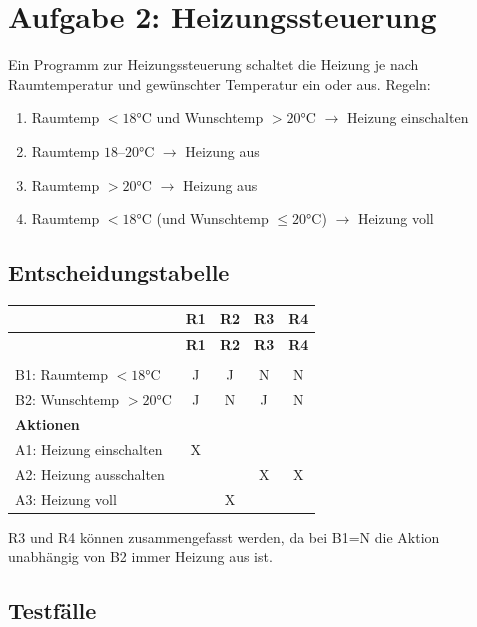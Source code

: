 \documentclass[
	fontsize=12pt,          %
	paper=a4,               %
	numbers=noenddot,       %
	listof=totoc,           %
	listof=entryprefix,     %
	listof=nochaptergap,    %
	bibliography=totoc,     %
	parskip=half,           %
	openany                 %
]{scrbook}
\begin{document}
\chapter*{Aufgabe 2: Heizungssteuerung}

Ein Programm zur Heizungssteuerung schaltet die Heizung je nach Raumtemperatur und gewünschter Temperatur ein oder aus.
Regeln:
\begin{enumerate}
	\item Raumtemp $< 18$°C und Wunschtemp $> 20$°C $\rightarrow$ Heizung einschalten
	\item Raumtemp $18$--$20$°C $\rightarrow$ Heizung aus
	\item Raumtemp $> 20$°C $\rightarrow$ Heizung aus
	\item Raumtemp $< 18$°C (und Wunschtemp $\leq 20$°C) $\rightarrow$ Heizung voll
\end{enumerate}

\section*{Entscheidungstabelle}

\begin{longtable}{| p{4.5cm} | c | c | c | c |}
	\hline
	& \textbf{R1} & \textbf{R2} & \textbf{R3} & \textbf{R4} \\ \hline
	\endfirsthead
	\hline
	& \textbf{R1} & \textbf{R2} & \textbf{R3} & \textbf{R4} \\ \hline
	\endhead
	\hline
	\endfoot
	\multicolumn{5}{|l|}{\textbf{Bedingungen}} \\ \hline
	B1: Raumtemp $< 18$°C & J & J & N & N \\ \hline
	B2: Wunschtemp $> 20$°C & J & N & J & N \\ \hline
	\multicolumn{5}{|l|}{\textbf{Aktionen}} \\ \hline
	A1: Heizung einschalten & X & & & \\ \hline
	A2: Heizung ausschalten & & & X & X \\ \hline
	A3: Heizung voll & & X & & \\ \hline
\end{longtable}

R3 und R4 können zusammengefasst werden, da bei B1=N die Aktion unabhängig von B2 immer \glqq Heizung aus\grqq{} ist.

\section*{Testfälle}
\end{document}
